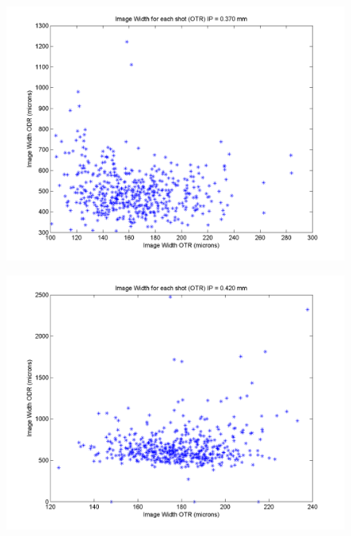 \documentclass[12pt]{article}
\begin{document}
\begin{figure}
\begin{center}
\includegraphics[scale=0.5]{Figures/ImageWidth_OTRODR_370.PNG}
\caption{}
\end{center}
\end{figure}

\begin{figure}
\begin{center}
\includegraphics[scale=0.5]{Figures/ImageWidth_OTRODR_420.PNG}
\caption{}
\end{center}
\end{figure}
\end{document}

